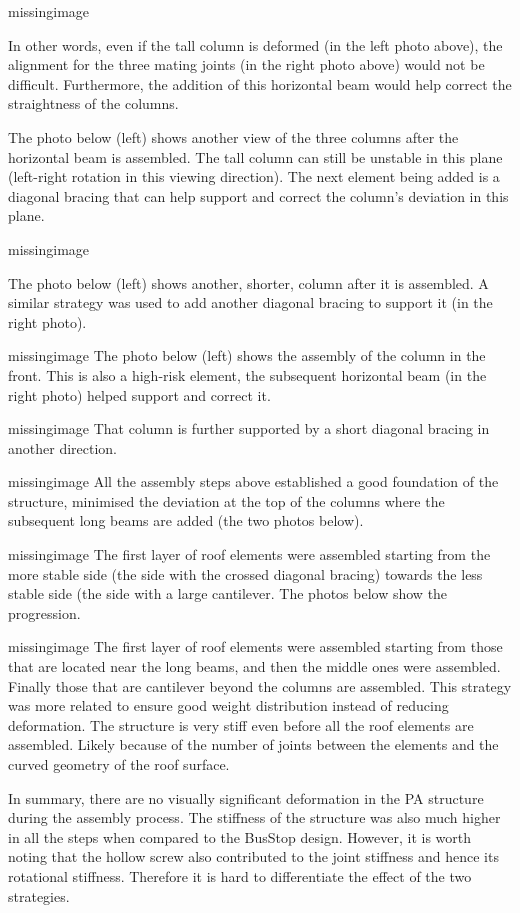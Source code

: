 missingimage

In other words, even if the tall column is deformed (in the left photo above), the alignment for the three mating joints (in the right photo above) would not be difficult. Furthermore, the addition of this horizontal beam would help correct the straightness of the columns.

The photo below (left) shows another view of the three columns after the horizontal beam is assembled. The tall column can still be unstable in this plane (left-right rotation in this viewing direction). The next element being added is a diagonal bracing that can help support and correct the column’s deviation in this plane.

missingimage

The photo below (left) shows another, shorter, column after it is assembled. A similar strategy was used to add another diagonal bracing to support it (in the right photo).

missingimage
The photo below (left) shows the assembly of the column in the front. This is also a high-risk element, the subsequent horizontal beam (in the right photo) helped support and correct it.

missingimage
That column is further supported by a short diagonal bracing in another direction.

missingimage
All the assembly steps above established a good foundation of the structure, minimised the deviation at the top of the columns where the subsequent long beams are added (the two photos below).  

missingimage
The first layer of roof elements were assembled starting from the more stable side (the side with the crossed diagonal bracing) towards the less stable side (the side with a large cantilever. The photos below show the progression.

missingimage
The first layer of roof elements were assembled starting from those that are located near the long beams, and then the middle ones were assembled. Finally those that are cantilever beyond the columns are assembled. This strategy was more related to ensure good weight distribution instead of reducing deformation. The structure is very stiff even before all the roof elements are assembled. Likely because of the number of joints between the elements and the curved geometry of the roof surface.

In summary, there are no visually significant deformation in the PA structure during the assembly process. The stiffness of the structure was also much higher in all the steps when compared to the BusStop design. However, it is worth noting that the hollow screw also contributed to the joint stiffness and hence its rotational stiffness. Therefore it is hard to differentiate the effect of the two strategies. 

